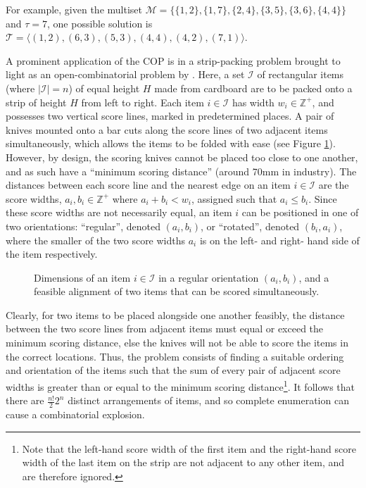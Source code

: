 \documentclass[oribibl]{llncs}
\begin{document}
For example, given the multiset $\mathcal{M} = \{\{1,2\}, \{1,7\}, \{2,4\}, \{3,5\}, \{3,6\}, \{4,4\}\}$ and $\tau = 7$, one possible solution is $\mathcal{T} = \langle(1,2), (6,3), (5,3), (4,4), (4,2), (7,1) \rangle$.

A prominent application of the COP is in a strip-packing problem brought to light as an open-combinatorial problem by \cite{goulimis2004}. Here, a set $\mathcal{I}$ of rectangular items (where $|\mathcal{I}| = n$) of equal height $H$ made from cardboard are to be packed onto a strip of height $H$ from left to right. Each item $i \in \mathcal{I}$ has width $w_i \in \mathbb{Z}^{+}$, and possesses two vertical score lines, marked in predetermined places. A pair of knives mounted onto a bar cuts along the score lines of two adjacent items simultaneously, which allows the items to be folded with ease (see Figure \ref{fig:itemsknife}). However, by design, the scoring knives cannot be placed too close to one another, and as such have a ``minimum scoring distance'' (around 70mm in industry). The distances between each score line and the nearest edge on an item $i \in \mathcal{I}$ are the score widths, $a_i, b_i \in \mathbb{Z}^{+}$ where $a_i + b_i < w_i$, assigned such that $a_i \leq b_i$. Since these score widths are not necessarily equal, an item $i$ can be positioned in one of two orientations: ``regular'', denoted $(a_i, b_i)$, or ``rotated'', denoted $(b_i, a_i)$, where the smaller of the two score widths $a_i$ is on the left- and right- hand side of the item respectively. 
\begin{figure}[H]	
	\centering
	
	\caption{Dimensions of an item $i \in \mathcal{I}$ in a regular orientation $(a_i, b_i)$, and a feasible alignment of two items that can be scored simultaneously.}	
	\label{fig:itemsknife}
\end{figure}

Clearly, for two items to be placed alongside one another feasibly, the distance between the two score lines from adjacent items must equal or exceed the minimum scoring distance, else the knives will not be able to score the items in the correct locations. Thus, the problem consists of finding a suitable ordering and orientation of the items such that the sum of every pair of adjacent score widths is greater than or equal to the minimum scoring distance\footnote{Note that the left-hand score width of the first item and the right-hand score width of the last item on the strip are not adjacent to any other item, and are therefore ignored.}. It follows that there are $\frac{n!}{2}2^n$ distinct arrangements of items, and so complete enumeration can cause a combinatorial explosion.
\end{document}
